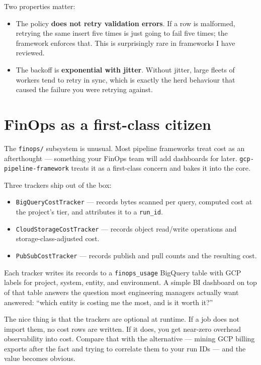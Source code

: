 \documentclass[
  11pt,
  british,
  oneside]{book}
\providecommand{\tightlist}{%
  \setlength{\itemsep}{0pt}\setlength{\parskip}{0pt}}
\begin{document}
Two properties matter:

\begin{itemize}
\tightlist
\item
  The policy \textbf{does not retry validation errors}. If a row is
  malformed, retrying the same insert five times is just going to fail
  five times; the framework enforces that. This is surprisingly rare in
  frameworks I have reviewed.
\item
  The backoff is \textbf{exponential with jitter}. Without jitter, large
  fleets of workers tend to retry in sync, which is exactly the herd
  behaviour that caused the failure you were retrying against.
\end{itemize}

\hypertarget{finops-as-a-first-class-citizen}{%
\section{FinOps as a first-class
citizen}\label{finops-as-a-first-class-citizen}}

The \texttt{finops/} subsystem is unusual. Most pipeline frameworks
treat cost as an afterthought --- something your FinOps team will add
dashboards for later. \texttt{gcp-pipeline-framework} treats it as a
first-class concern and bakes it into the core.

Three trackers ship out of the box:

\begin{itemize}
\tightlist
\item
  \texttt{BigQueryCostTracker} --- records bytes scanned per query,
  computed cost at the project's tier, and attributes it to a
  \texttt{run\_id}.
\item
  \texttt{CloudStorageCostTracker} --- records object read/write
  operations and storage-class-adjusted cost.
\item
  \texttt{PubSubCostTracker} --- records publish and pull counts and the
  resulting cost.
\end{itemize}

Each tracker writes its records to a \texttt{finops\_usage} BigQuery
table with GCP labels for project, system, entity, and environment. A
simple BI dashboard on top of that table answers the question most
engineering managers actually want answered: ``which entity is costing
me the most, and is it worth it?''

The nice thing is that the trackers are optional at runtime. If a job
does not import them, no cost rows are written. If it does, you get
near-zero overhead observability into cost. Compare that with the
alternative --- mining GCP billing exports after the fact and trying to
correlate them to your run IDs --- and the value becomes obvious.
\end{document}
